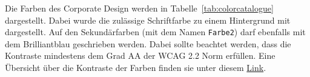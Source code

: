\documentclass[
  logo={
    color=blue,
    language=de,
    colormodel=rgb
  },
  fontsize=11tudpt,
  usemargin,
  oneside
]{tudcdreprt}
\begin{document}
Die Farben des Corporate Design werden in Tabelle~\ref{tab:colorcatalogue} dargestellt.
Dabei wurde die zulässige Schriftfarbe zu einem Hintergrund mit dargestellt.
Auf den Sekundärfarben (mit dem Namen \texttt{Farbe2})
darf ebenfalls mit dem Brilliantblau geschrieben werden.
Dabei sollte beachtet werden, dass die Kontraste mindestens dem Grad AA
der WCAG 2.2 Norm erfüllen. %
Eine Übersicht über die Kontraste der Farben finden sie unter diesem
\href{https://contrast-grid.eightshapes.com/?version=1.1.0&background-colors=&foreground-colors=%2300005A%2C%20Dunkelblau%0D%0A%2300008C%2C%20Prim%C3%A4rblau%0D%0A%232F57B2%2C%20Blau%201%0D%0A%237369BE%2C%20Violett%201%0D%0A%23BC1589%2C%20Pink%201%0D%0A%23D20F41%2C%20Rot%201%0D%0A%23C85000%2C%20Orange%201%0D%0A%23FFC700%2C%20Gelb%201%0D%0A%23767A23%2C%20Oliv%201%0D%0A%23007D4B%2C%20Gr%C3%BCn%201%0D%0A%230A777F%2C%20Petrol%201%0D%0A%2397C6FF%2C%20Blau%202%0D%0A%23C8C8FF%2C%20Violett%202%0D%0A%23FFB9FF%2C%20Pink%202%0D%0A%23FFAAA5%2C%20Rot%202%0D%0A%23FFBE78%2C%20Orange%202%0D%0A%23FFE483%2C%20Gelb%202%0D%0A%23D2DC46%2C%20Oliv%202%0D%0A%238CE6AA%2C%20Gr%C3%BCn%202%0D%0A%238CE6D7%2C%20Petrol%202%0D%0A%23000000%2C%20Schwarz%0D%0A%23323F4B%2C%20Grau%20100%0D%0A%23566371%2C%20Grau%2080%0D%0A%237D8894%2C%20Grau%2060%0D%0A%23A5AEB8%2C%20Grau%2040%0D%0A%23D0D5DC%2C%20Grau%2020%0D%0A%23E7E9ED%2C%20Grau%2010%0D%0A%23FFFFFF%2C%20Wei%C3%9F&es-color-form__tile-size=compact&es-color-form__show-contrast=aaa&es-color-form__show-contrast=aa&es-color-form__show-contrast=aa18&es-color-form__show-contrast=dnp}{Link}.
\end{document}
